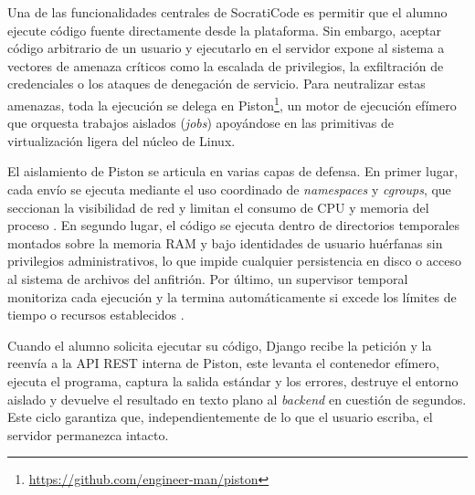 Una de las funcionalidades centrales de SocratiCode es permitir que el alumno ejecute código fuente directamente desde la plataforma. Sin embargo, aceptar código arbitrario de un usuario y ejecutarlo en el servidor expone al sistema a vectores de amenaza críticos como la escalada de privilegios, la exfiltración de credenciales o los ataques de denegación de servicio. Para neutralizar estas amenazas, toda la ejecución se delega en Piston\footnote{\url{https://github.com/engineer-man/piston}}, un motor de ejecución efímero que orquesta trabajos aislados (\textit{jobs}) apoyándose en las primitivas de virtualización ligera del núcleo de Linux.

El aislamiento de Piston se articula en varias capas de defensa. En primer lugar, cada envío se ejecuta mediante el uso coordinado de \textit{namespaces} y \textit{cgroups}, que seccionan la visibilidad de red y limitan el consumo de CPU y memoria del proceso \cite{rosen2013resource}. En segundo lugar, el código se ejecuta dentro de directorios temporales montados sobre la memoria RAM y bajo identidades de usuario huérfanas sin privilegios administrativos, lo que impide cualquier persistencia en disco o acceso al sistema de archivos del anfitrión. Por último, un supervisor temporal monitoriza cada ejecución y la termina automáticamente si excede los límites de tiempo o recursos establecidos \cite{engineerman_piston}.

Cuando el alumno solicita ejecutar su código, Django recibe la petición y la reenvía a la API REST interna de Piston, este levanta el contenedor efímero, ejecuta el programa, captura la salida estándar y los errores, destruye el entorno aislado y devuelve el resultado en texto plano al \textit{backend} en cuestión de segundos. Este ciclo garantiza que, independientemente de lo que el usuario escriba, el servidor permanezca intacto.
